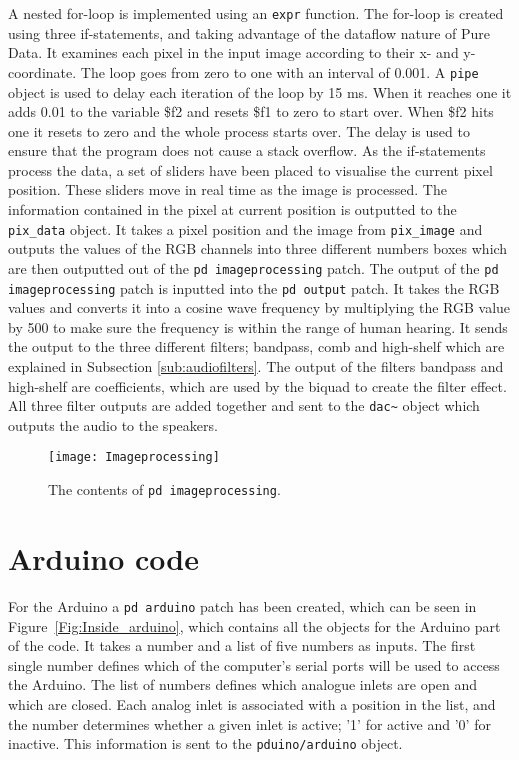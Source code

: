 A nested for-loop is implemented using an \texttt{expr} function. The for-loop is created using three if-statements, and taking advantage of the dataflow nature of Pure Data. It examines each pixel in the input image according to their x- and y-coordinate.
The loop goes from zero to one with an interval of 0.001. A \texttt{pipe} object is used to delay each iteration of the loop by 15 ms. When it reaches one it adds 0.01 to the variable \$f2 and resets \$f1 to zero to start over. When \$f2 hits one it resets to zero and the whole process starts over. The delay is used to ensure that the program does not cause a stack overflow. 
As the if-statements process the data, a set of sliders have been placed to visualise the current pixel position. These sliders move in real time as the image is processed. The information contained in the pixel at current position is outputted to the \texttt{pix\_data} object. It takes a pixel position and the image from \texttt{pix\_image} and outputs the values of the RGB channels into three different numbers boxes which are then outputted out of the \texttt{pd imageprocessing} patch. The output of the \texttt{pd imageprocessing} patch is inputted into the \texttt{pd output} patch. It takes the RGB values and converts it into a cosine wave frequency by multiplying the RGB value by 500 to make sure the frequency is within the range of human hearing. It sends the output to the three different filters; bandpass, comb and high-shelf which are explained in Subsection \ref{sub:audiofilters}. The output of the filters bandpass and high-shelf are coefficients, which are used by the biquad to create the filter effect. All three filter outputs are added together and sent to the \texttt{dac\~} object which outputs the audio to the speakers. 

\begin{figure}
\centering
\texttt{[image: Imageprocessing]}
\caption{The contents of \texttt{pd imageprocessing}.}
\label{Fig:Imageprocessing}
\end{figure}


\section{Arduino code}
For the Arduino a \texttt{pd arduino} patch has been created, which can be seen in Figure~\ref{Fig:Inside_arduino}, which contains all the objects for the Arduino part of the code. It takes a number and a list of five numbers as inputs. The first single number defines which of the computer's serial ports will be used to access the Arduino. The list of numbers defines which analogue inlets are open and which are closed. Each analog inlet is associated with a position in the list, and the number determines whether a given inlet is active; '1' for active and '0' for inactive. This information is sent to the \texttt{pduino/arduino} object.

